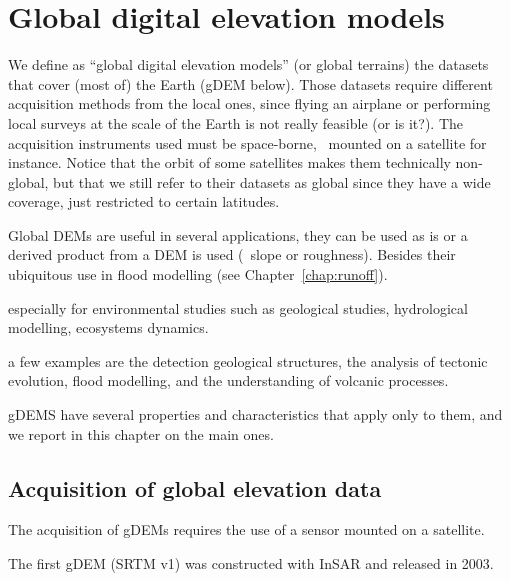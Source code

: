 
\setchapterpreamble[u]{\margintoc}
\graphicspath{{gdem/figs/}}


\chapter{Global digital elevation models}%
\label{chap:gdem}

We define as ``global digital elevation models'' (or global terrains) the datasets that cover (most of) the Earth (gDEM below).%
Those datasets require different acquisition methods from the local ones, since flying an airplane or performing local surveys at the scale of the Earth is not really feasible (or is it?).
The acquisition instruments used must be space-borne, \ie\ mounted on a satellite for instance.
Notice that the orbit of some satellites makes them technically non-global, but that we still refer to their datasets as global since they have a wide coverage, just restricted to certain latitudes.

Global DEMs are useful in several applications, they can be used as is or a derived product from a DEM is used (\eg\ slope or roughness).
Besides their ubiquitous use in flood modelling (see Chapter~\ref{chap:runoff}).

especially for environmental studies such as geological studies, hydrological modelling, ecosystems dynamics.

a few examples are the detection geological structures, the analysis of tectonic evolution, flood modelling, and the understanding of volcanic processes.


gDEMS have several properties and characteristics that apply only to them, and we report in this chapter on the main ones.



%
\section[Acquisition of global data]{Acquisition of global elevation data}

The acquisition of gDEMs requires the use of a sensor mounted on a satellite.

The first gDEM (SRTM v1) was constructed with InSAR and released in 2003. 

